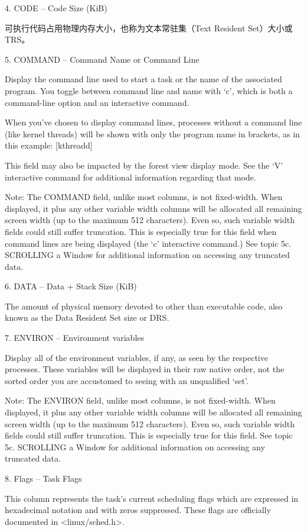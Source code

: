 4. CODE  --  Code Size (KiB) \par
\qquad 可执行代码占用物理内存大小，也称为文本常驻集（Text Resident Set）大小或TRS。

5. COMMAND  --  Command Name or Command Line    \par
Display the command line used to start a task or the name of the associated program.  You toggle between command line and name with `c', which is both a command-line option and an interactive command.

When you've chosen to display command lines, processes without a command line (like kernel threads) will be shown with only the program name in brackets, as in this example:
    [kthreadd]

This field may also be impacted by the forest view display mode.  See the `V' interactive command for additional information regarding that mode.

Note: The COMMAND field, unlike most columns, is not fixed-width.  When displayed, it plus any other variable width columns will be allocated all remaining screen width (up to the maximum 512 characters).  Even so, such variable width fields could  still
suffer truncation.  This is especially true for this field when command lines are being displayed (the `c' interactive command.)  See topic 5c. SCROLLING a Window for additional information on accessing any truncated data.


6. DATA  --  Data + Stack Size (KiB)    \par
The amount of physical memory devoted to other than executable code, also known as the Data Resident Set size or DRS.

7. ENVIRON  --  Environment variables   \par
Display all of the environment variables, if any, as seen by the respective processes.  These variables will be displayed in their raw native order, not the sorted order you are accustomed to seeing with an unqualified `set'.

Note:  The ENVIRON field, unlike most columns, is not fixed-width.  When displayed, it plus any other variable width columns will be allocated all remaining screen width (up to the maximum 512 characters).  Even so, such variable width fields could still
suffer truncation.  This is especially true for this field.  See topic 5c. SCROLLING a Window for additional information on accessing any truncated data.

8. Flags  --  Task Flags    \par
This column represents the task's current scheduling flags which are expressed in hexadecimal notation and with zeros suppressed.  These flags are officially documented in <linux/sched.h>.

